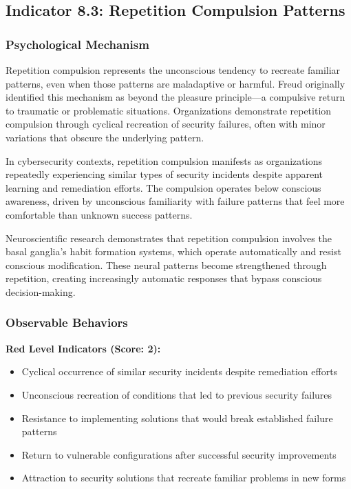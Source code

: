 \documentclass[11pt,a4paper]{article}
\begin{document}
\subsection{Indicator 8.3: Repetition Compulsion Patterns}

\subsubsection{Psychological Mechanism}

Repetition compulsion represents the unconscious tendency to recreate familiar patterns, even when those patterns are maladaptive or harmful. Freud originally identified this mechanism as beyond the pleasure principle---a compulsive return to traumatic or problematic situations\cite{freud1920}. Organizations demonstrate repetition compulsion through cyclical recreation of security failures, often with minor variations that obscure the underlying pattern.

In cybersecurity contexts, repetition compulsion manifests as organizations repeatedly experiencing similar types of security incidents despite apparent learning and remediation efforts. The compulsion operates below conscious awareness, driven by unconscious familiarity with failure patterns that feel more comfortable than unknown success patterns.

Neuroscientific research demonstrates that repetition compulsion involves the basal ganglia's habit formation systems, which operate automatically and resist conscious modification\cite{graybiel2008}. These neural patterns become strengthened through repetition, creating increasingly automatic responses that bypass conscious decision-making.

\subsubsection{Observable Behaviors}

\textbf{Red Level Indicators (Score: 2):}
\begin{itemize}
\item Cyclical occurrence of similar security incidents despite remediation efforts
\item Unconscious recreation of conditions that led to previous security failures
\item Resistance to implementing solutions that would break established failure patterns
\item Return to vulnerable configurations after successful security improvements
\item Attraction to security solutions that recreate familiar problems in new forms
\end{itemize}
\end{document}
